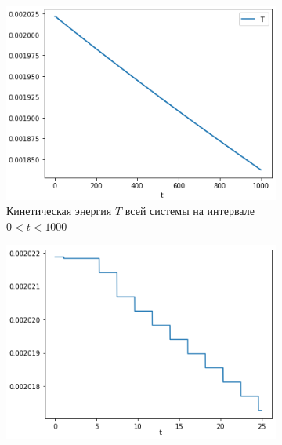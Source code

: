 \begin{figure}[htb]
    \centering
        \vspace{-25pt}
        \begin{subfigure}[t]{\textwidth}
            \centering
            \includegraphics[width=\linewidth]{content/pic/new/impact/impact_1_T_long.png}
            \vspace{-25pt}
            \caption{Кинетическая энергия $T$ всей системы на интервале $0 < t < 1000$}
            \label{fig:self_rot_T_long}
        \end{subfigure}
        \begin{subfigure}[t]{\textwidth}
            \vspace{15pt}
            \centering
            \includegraphics[width=\linewidth]{content/pic/new/impact/impact_1_T.png}

\end{subfigure}
\end{figure}
